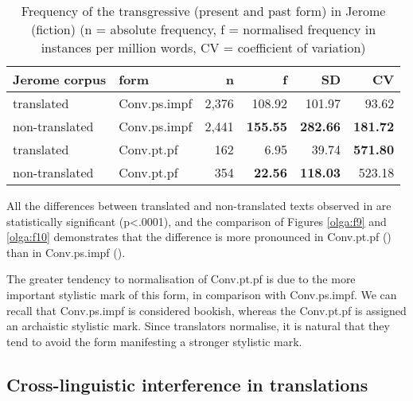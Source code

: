 \documentclass[output=paper,russian]{langsci/langscibook}
\begin{document}
\begin{table}\caption{Frequency of the transgressive (present and past form) in Jerome (fiction) (n = absolute frequency, f = normalised frequency in instances per million words, CV = coefficient of variation)}\label{olga:t6}
  \begin{tabularx}{\textwidth}{XXrrrr}
    \lsptoprule
    \textbf{Jerome corpus} & \textbf{form} & \textbf{n} & \textbf{f} & \textbf{SD} & \textbf{CV}\\
    \midrule
    translated      & Conv.ps.impf  & 2,376 & 108.92          & 101.97          & 93.62\\
    non-translated  & Conv.ps.impf  & 2,441 & \textbf{155.55} & \textbf{282.66} & \textbf{181.72}\\
    translated      & Conv.pt.pf    & 162   & 6.95            & 39.74           & \textbf{571.80}\\
    non-translated  & Conv.pt.pf    & 354   & \textbf{22.56}  & \textbf{118.03} & 523.18\\
    \bottomrule
  \end{tabularx}
\end{table}

All the differences between translated and non-translated texts observed in  are statistically significant (p<.0001), and the comparison of Figures \ref{olga:f9} and \ref{olga:f10} demonstrates that the difference is more pronounced in Conv.pt.pf () than in Conv.ps.impf ().

\begin{figure}
\end{figure}

The greater tendency to normalisation of Conv.pt.pf is due to the more important stylistic mark of this form, in comparison with Conv.ps.impf. We can recall that Conv.ps.impf is considered bookish, whereas the Conv.pt.pf is assigned an archaistic stylistic mark. Since translators normalise, it is natural that they tend to avoid the form manifesting a stronger stylistic mark. 

\subsection{Cross-linguistic interference in translations}\label{olga:anacl}
\end{document}
